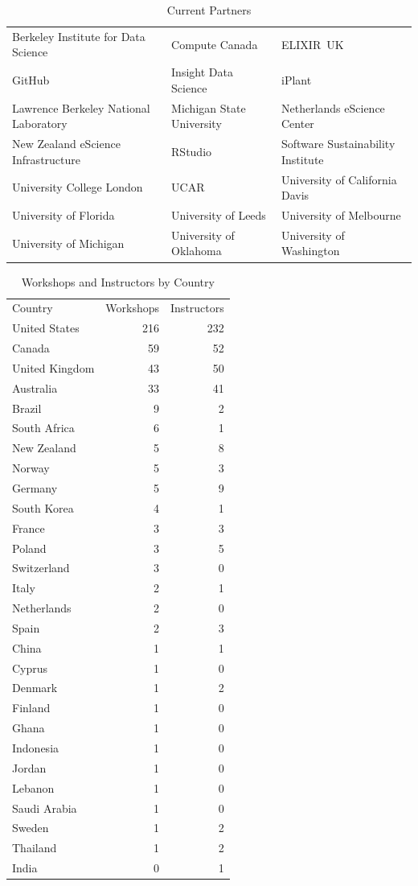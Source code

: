 \documentclass[10pt,a4paper,twocolumn]{article}
\begin{document}
\begin{table}
\centering
\begin{tabular}{lll}
Berkeley Institute for Data Science & Compute Canada & ELIXIR~UK \\
GitHub & Insight Data Science & iPlant \\
Lawrence Berkeley National Laboratory & Michigan State University & Netherlands eScience Center \\
New Zealand eScience Infrastructure & RStudio & Software Sustainability Institute \\
University College London & UCAR & University of California Davis \\
University of Florida & University of Leeds & University of Melbourne \\
University of Michigan & University of Oklahoma & University of Washington
\end{tabular}
\caption{Current Partners}
\label{t:current-partners}
\end{table}

\begin{table}
\centering
\begin{tabular}{lrr}
Country & Workshops & Instructors \\
United States & 216 & 232 \\
Canada & 59 & 52 \\
United Kingdom & 43 & 50 \\
Australia & 33 & 41 \\
Brazil & 9 & 2 \\
South Africa & 6 & 1 \\
New Zealand & 5 & 8 \\
Norway & 5 & 3 \\
Germany & 5 & 9 \\
South Korea & 4 & 1 \\
France & 3 & 3 \\
Poland & 3 & 5 \\
Switzerland & 3 & 0 \\
Italy & 2 & 1 \\
Netherlands & 2 & 0 \\
Spain & 2 & 3 \\
China & 1 & 1 \\
Cyprus & 1 & 0 \\
Denmark & 1 & 2 \\
Finland & 1 & 0 \\
Ghana & 1 & 0 \\
Indonesia & 1 & 0 \\
Jordan & 1 & 0 \\
Lebanon & 1 & 0 \\
Saudi Arabia & 1 & 0 \\
Sweden & 1 & 2 \\
Thailand & 1 & 2 \\
India & 0 & 1 \\
\end{tabular}
\caption{Workshops and Instructors by Country}
\label{t:by-country}
\end{table}
\end{document}
